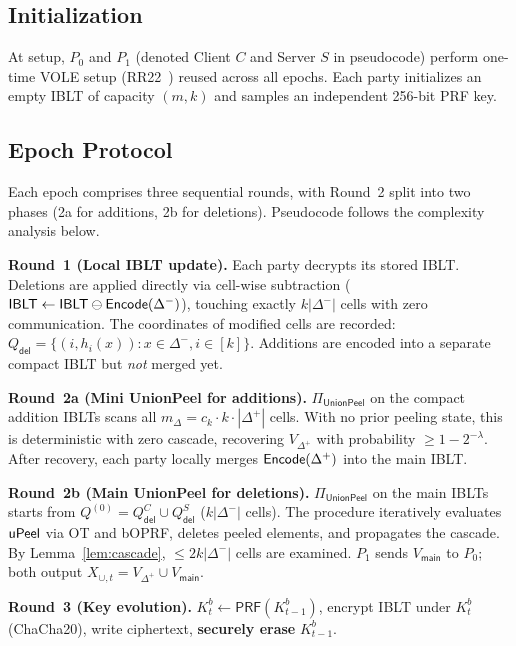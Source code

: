 \documentclass[letterpaper,twocolumn,10pt]{article}
\theoremstyle{definition}
\newcommand{\PRF}{\mathsf{PRF}}\newcommand{\ChaCha}{\mathsf{ChaCha20}}
\begin{document}
\subsection{Initialization}

At setup, $P_0$ and $P_1$ (denoted Client $C$ and Server $S$ in pseudocode)
perform one-time VOLE setup (RR22~\cite{RR22}) reused across all epochs.
Each party initializes an empty IBLT of capacity $(m, k)$ and samples an
independent 256-bit PRF key.

\subsection{Epoch Protocol}

Each epoch comprises three sequential rounds, with Round~2 split into two
phases (2a for additions, 2b for deletions). Pseudocode follows the
complexity analysis below.

\noindent\textbf{Round~1 (Local IBLT update).}
Each party decrypts its stored IBLT. Deletions are applied directly via
cell-wise subtraction ($\mathsf{IBLT} \leftarrow \mathsf{IBLT} \ominus
\mathsf{Encode}(\Delta^-)$), touching exactly $k|\Delta^-|$ cells with zero
communication. The coordinates of modified cells
are recorded: $Q_{\mathsf{del}} = \{(i, h_i(x)) : x \in \Delta^-, i \in [k]\}$.
Additions are encoded into a separate compact IBLT but \emph{not} merged yet.

\noindent\textbf{Round~2a (Mini UnionPeel for additions).}
$\Pi_{\mathsf{UnionPeel}}$ on the compact addition IBLTs scans all $m_{\Delta}
= c_k \cdot k \cdot |\Delta^+|$ cells. With no prior peeling state, this is
deterministic with zero cascade, recovering $V_{\Delta^+}$ with probability
$\geq 1 - 2^{-\lambda}$. After recovery, each party locally merges
$\mathsf{Encode}(\Delta^+)$ into the main IBLT.

\noindent\textbf{Round~2b (Main UnionPeel for deletions).}
$\Pi_{\mathsf{UnionPeel}}$ on the main IBLTs starts from $Q^{(0)} =
Q_{\mathsf{del}}^C \cup Q_{\mathsf{del}}^S$ ($k|\Delta^-|$ cells). The
procedure iteratively evaluates $\mathsf{uPeel}$ via OT and bOPRF, deletes peeled
elements, and propagates the cascade. By Lemma~\ref{lem:cascade}, $\leq
2k|\Delta^-|$ cells are examined. $P_1$ sends $V_{\mathsf{main}}$ to $P_0$;
both output $X_{\cup,t} = V_{\Delta^+} \cup V_{\mathsf{main}}$.

\noindent\textbf{Round~3 (Key evolution).}
$K^b_t \leftarrow \PRF(K^b_{t-1})$, encrypt IBLT under $K^b_t$ (ChaCha20),
write ciphertext, \textbf{securely erase} $K^b_{t-1}$.
\end{document}
